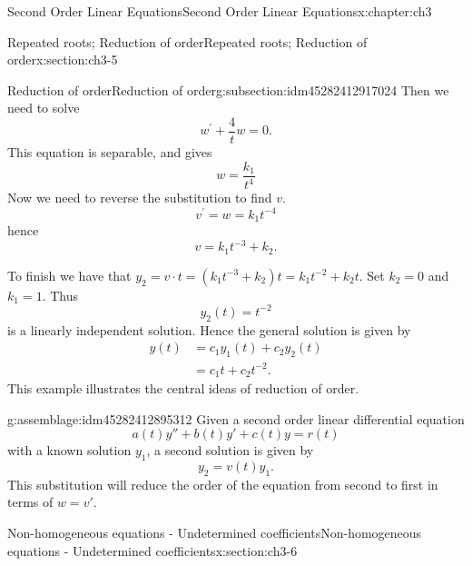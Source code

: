 \documentclass[oneside,10pt,]{book}
\numberwithin{equation}{section}
\numberwithin{equation}{section}
\newcommand{\amp}{&}
\begin{document}
\begin{chapterptx}{Second Order Linear Equations}{}{Second Order Linear Equations}{}{}{x:chapter:ch3}
\begin{sectionptx}{Repeated roots; Reduction of order}{}{Repeated roots; Reduction of order}{}{}{x:section:ch3-5}
\begin{subsectionptx}{Reduction of order}{}{Reduction of order}{}{}{g:subsection:idm45282412917024}
 Then we need to solve%
\begin{equation*}
w^{\prime}+\frac{4}{t}w=0.
\end{equation*}
This equation is separable, and gives%
\begin{equation*}
w = \frac{k_{1}}{t^{4}}
\end{equation*}
Now we need to reverse the substitution to find \(v\).%
\begin{equation*}
v^{\prime}=w=k_{1}t^{-4}
\end{equation*}
hence%
\begin{equation*}
v=k_{1}t^{-3}+k_{2}.
\end{equation*}
%
\par
To finish we have that \(y_{2}=v\cdot t=\left(k_{1}t^{-3}+k_{2}\right)t=k_{1}t^{-2}+k_{2}t\). Set \(k_{2}=0\) and \(k_{1}=1\). Thus%
\begin{equation*}
y_{2}(t)=t^{-2}
\end{equation*}
is a linearly independent solution. Hence the general solution is given by%
\begin{align*}
y(t) \amp =c_{1}y_{1}(t)+c_{2}y_{2}(t)\\
\amp =c_{1}t+c_{2}t^{-2}.
\end{align*}
%
 This example illustrates the central ideas of reduction of order. \begin{assemblage}{}{g:assemblage:idm45282412895312}%
Given a second order linear differential equation%
\begin{equation*}
a(t) y'' + b(t) y' + c(t) y = r(t)
\end{equation*}
with a known solution \(y_1\), a second solution is given by%
\begin{equation*}
y_2 = v(t)y_1.
\end{equation*}
This substitution will reduce the order of the equation from second to first in terms of \(w = v'\).%
\end{assemblage}
\end{subsectionptx}
\end{sectionptx}
%
%
\typeout{************************************************}
\typeout{************************************************}
%
\begin{sectionptx}{Non-homogeneous equations - Undetermined coefficients}{}{Non-homogeneous equations - Undetermined coefficients}{}{}{x:section:ch3-6}
%
%
\typeout{************************************************}

\end{sectionptx}
\end{chapterptx}
\end{document}
